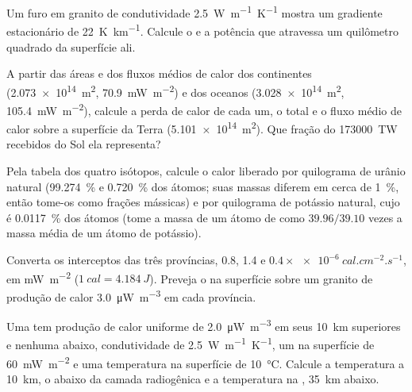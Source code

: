 \begin{exercise}[$\star$]\label{exo:b1:heat-budget:1}
Um furo em granito de condutividade \qty{2.5}{W.m^{-1}.K^{-1}} mostra um
gradiente estacionário de \qty{22}{K.km^{-1}}. Calcule o  e a potência que
atravessa um quilômetro quadrado da superfície ali.
\end{exercise}

\begin{exercise}[$\star$]\label{exo:b1:heat-budget:2}
A partir das áreas e dos fluxos médios de calor dos continentes (\qty{2.073e14}{m^2},
\qty{70.9}{mW.m^{-2}}) e dos oceanos (\qty{3.028e14}{m^2},
\qty{105.4}{mW.m^{-2}}), calcule a perda de calor de cada um, o total e o fluxo
médio de calor sobre a superfície da Terra (\qty{5.101e14}{m^2}). Que fração do
\qty{173000}{TW} recebidos do Sol ela representa?
\end{exercise}

\begin{exercise}[$\star$]\label{exo:b1:heat-budget:3}
Pela tabela dos quatro isótopos, calcule o calor liberado por quilograma de urânio
natural (\qty{99.274}{\percent}  e \qty{0.720}{\percent}
 dos átomos; suas massas diferem em cerca de \qty{1}{\percent}, então
tome-os como frações mássicas) e por quilograma de potássio natural, cujo
 é \qty{0.0117}{\percent} dos átomos (tome a massa de um
átomo de  como $39.96/39.10$ vezes a massa média de um átomo de potássio).
\end{exercise}

\begin{exercise}[$\star$]\label{exo:b1:heat-budget:4}
Converta os interceptos das três províncias, 0.8, 1.4 e
$0.4\times\qty{e-6}{cal.cm^{-2}.s^{-1}}$, em \unit{mW.m^{-2}}
($\qty{1}{cal} = \qty{4.184}{J}$). Preveja o  na superfície sobre um granito
de produção de calor \qty{3.0}{\micro W.m^{-3}} em cada província.
\end{exercise}

\begin{exercise}[$\star\star$]\label{exo:b1:heat-budget:5}
Uma  tem produção de calor uniforme de \qty{2.0}{\micro W.m^{-3}} em seus
\qty{10}{km} superiores e nenhuma abaixo, condutividade de \qty{2.5}{W.m^{-1}.K^{-1}}, um
 na superfície de \qty{60}{mW.m^{-2}} e uma temperatura na superfície de
\qty{10}{\degreeCelsius}. Calcule a temperatura a \qty{10}{km}, o 
abaixo da camada radiogênica e a temperatura na , \qty{35}{km} abaixo.
\end{exercise}

